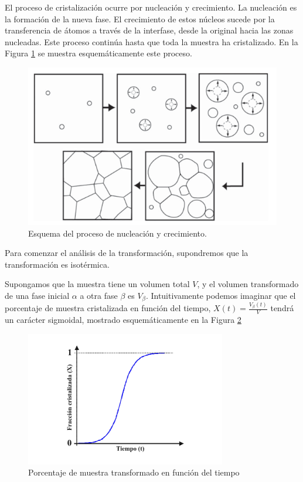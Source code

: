 \documentclass[12pt]{article}
\theoremstyle{definition}
\theoremstyle{remark}
\begin{document}
 El proceso de cristalización ocurre por nucleación y crecimiento. La nucleación es la formación de la nueva fase. El crecimiento de estos núcleos sucede por la transferencia de átomos a través de la interfase, desde la original hacia las zonas nucleadas. Este proceso continúa hasta que toda la muestra ha cristalizado. En la Figura \ref{cristalization} se muestra esquemáticamente este proceso.
 \begin{figure}[H]
 	\centering
	\includegraphics[scale=0.5]{img/cristalization.png}
 	\caption{Esquema del proceso de nucleación y crecimiento.}
	\label{cristalization}
\end{figure} 

Para comenzar el análisis de la transformación, supondremos que la transformación es isotérmica.

Supongamos que la muestra tiene un volumen total $V$, y el volumen transformado de una fase inicial $\alpha$ a otra fase $\beta$ es $V_\beta$. Intuitivamente podemos imaginar que el porcentaje de muestra cristalizada en función del tiempo, $X(t) = \frac{V_\beta (t)}{V}$ tendrá un carácter sigmoidal, mostrado esquemáticamente en la Figura \ref{cvst}

 \begin{figure}[H]
 	\centering
	\includegraphics[scale=1]{img/cristalization_vs_tiempo.png}
 	\caption{Porcentaje de muestra transformado en función del tiempo}
	\label{cvst}
\end{figure} 
\end{document}
